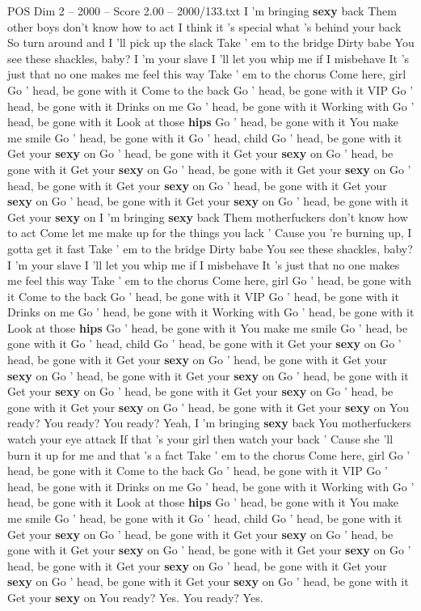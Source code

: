 \begin{textsample}{POS Dim 2 – 2000 – Score 2.00 – 2000/133.txt}  \label{ex:f2_pos_007}
I 'm bringing \textbf{sexy} back Them other boys don't know how to act I think it 's special what 's behind your back So turn around and I 'll pick up the slack Take ' em to the bridge Dirty babe You see these shackles, baby?
I 'm your slave I 'll let you whip me if I misbehave It 's just that no one makes me feel this way Take ' em to the chorus Come here, girl Go ' head, be gone with it Come to the back Go ' head, be gone with it VIP Go ' head, be gone with it Drinks on me Go ' head, be gone with it Working with Go ' head, be gone with it Look at those \textbf{hips} Go ' head, be gone with it You make me smile Go ' head, be gone with it Go ' head, child Go ' head, be gone with it Get your \textbf{sexy} on Go ' head, be gone with it Get your \textbf{sexy} on Go ' head, be gone with it Get your \textbf{sexy} on Go ' head, be gone with it Get your \textbf{sexy} on Go ' head, be gone with it Get your \textbf{sexy} on Go ' head, be gone with it Get your \textbf{sexy} on Go ' head, be gone with it Get your \textbf{sexy} on Go ' head, be gone with it Get your \textbf{sexy} on I 'm bringing \textbf{sexy} back Them motherfuckers don't know how to act Come let me make up for the things you lack ' Cause you 're burning up, I gotta get it fast Take ' em to the bridge Dirty babe You see these shackles, baby?
I 'm your slave I 'll let you whip me if I misbehave It 's just that no one makes me feel this way Take ' em to the chorus Come here, girl Go ' head, be gone with it Come to the back Go ' head, be gone with it VIP Go ' head, be gone with it Drinks on me Go ' head, be gone with it Working with Go ' head, be gone with it Look at those \textbf{hips} Go ' head, be gone with it You make me smile Go ' head, be gone with it Go ' head, child Go ' head, be gone with it Get your \textbf{sexy} on Go ' head, be gone with it Get your \textbf{sexy} on Go ' head, be gone with it Get your \textbf{sexy} on Go ' head, be gone with it Get your \textbf{sexy} on Go ' head, be gone with it Get your \textbf{sexy} on Go ' head, be gone with it Get your \textbf{sexy} on Go ' head, be gone with it Get your \textbf{sexy} on Go ' head, be gone with it Get your \textbf{sexy} on You ready?
You ready?
You ready?
Yeah, I 'm bringing \textbf{sexy} back You motherfuckers watch your eye attack If that 's your girl then watch your back ' Cause she 'll burn it up for me and that 's a fact Take ' em to the chorus Come here, girl Go ' head, be gone with it Come to the back Go ' head, be gone with it VIP Go ' head, be gone with it Drinks on me Go ' head, be gone with it Working with Go ' head, be gone with it Look at those \textbf{hips} Go ' head, be gone with it You make me smile Go ' head, be gone with it Go ' head, child Go ' head, be gone with it Get your \textbf{sexy} on Go ' head, be gone with it Get your \textbf{sexy} on Go ' head, be gone with it Get your \textbf{sexy} on Go ' head, be gone with it Get your \textbf{sexy} on Go ' head, be gone with it Get your \textbf{sexy} on Go ' head, be gone with it Get your \textbf{sexy} on Go ' head, be gone with it Get your \textbf{sexy} on Go ' head, be gone with it Get your \textbf{sexy} on You ready?
Yes.
You ready?
Yes.

\end{textsample}
